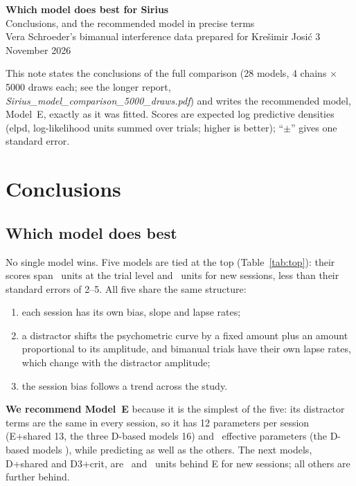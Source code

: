 
\usepackage{makecell}


\newcommand{\hi}{\mathrm{hi}}
\newcommand{\lo}{\mathrm{lo}}
\newcommand{\bi}{\mathrm{bi}}
\newcommand{\sig}{\operatorname{logistic}}
\newcommand{\HN}{\operatorname{HalfNormal}}
\newcommand{\N}{\mathcal{N}}



\begin{center}
{\sffamily\bfseries\LARGE Which model does best for Sirius}\\[0.35em]
{\sffamily\large Conclusions, and the recommended model in precise terms}\\[0.6em]
{\small\color{ink2} Vera Schroeder's bimanual interference data \textperiodcentered{} prepared for Kre\v{s}imir Josi\'c \textperiodcentered{} 3 November 2026}
\end{center}
\vspace{0.3em}

{\small This note states the conclusions of the full comparison (28 models, 4 chains $\times$ 5000 draws each; see the longer report, \emph{Sirius\_model\_comparison\_5000\_draws.pdf}) and writes the recommended model, Model~E, exactly as it was fitted.
Scores are expected log predictive densities (elpd, log-likelihood units summed over trials; higher is better); ``$\pm$'' gives one standard error.}

\section{Conclusions}

\subsection{Which model does best}
No single model wins.
Five models are tied at the top (Table~\ref{tab:top}): their scores span \cnTopSpreadTrial\ units at the trial level and \cnTopSpreadLoso\ units for new sessions, less than their standard errors of 2--5.
All five share the same structure:
\begin{enumerate}[label=(\roman*)]
\item each session has its own bias, slope and lapse rates;
\item a distractor shifts the psychometric curve by a fixed amount plus an amount proportional to its amplitude, and bimanual trials have their own lapse rates, which change with the distractor amplitude;
\item the session bias follows a trend across the study.
\end{enumerate}
\textbf{We recommend Model~E} because it is the simplest of the five: its distractor terms are the same in every session, so it has 12 parameters per session (E+shared 13, the three D-based models 16) and \cnPlooE\ effective parameters (the D-based models \cnPlooCrit), while predicting as well as the others.
The next models, D+shared and D3+crit, are \cnEminusDsharedLoso\ and \cnEminusDthreeCritLoso\ units behind E for new sessions; all others are further behind.

